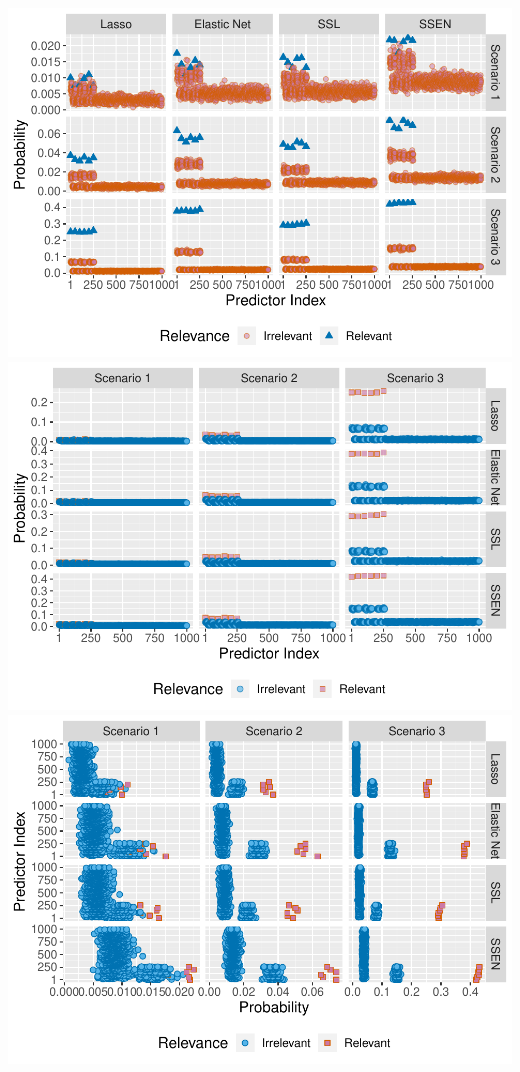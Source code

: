 \documentclass[
]{article}
\begin{document}
\includegraphics{simulation_results_files/figure-latex/unnamed-chunk-20-1.pdf}
\includegraphics{simulation_results_files/figure-latex/unnamed-chunk-20-2.pdf}
\includegraphics{simulation_results_files/figure-latex/unnamed-chunk-20-3.pdf}
\end{document}
